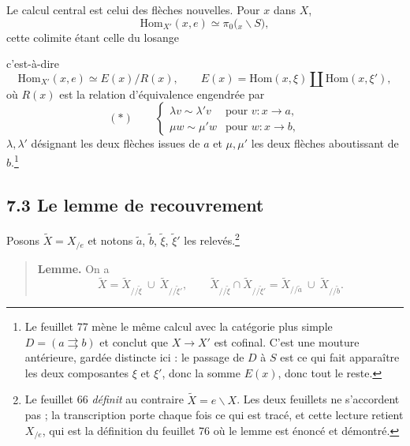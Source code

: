 \documentclass[11pt,a4paper]{article}
\begin{document}

Le calcul central est celui des flèches nouvelles. Pour $x$ dans $X$,
\[
  \mathrm{Hom}_{X'}(x,e) \simeq \pi_{0}\bigl({}_{x}\backslash S\bigr),
\]
cette colimite étant celle du losange

c'est-à-dire
\[
  \mathrm{Hom}_{X'}(x,e) \simeq E(x)/R(x),
  \qquad E(x) = \mathrm{Hom}(x,\xi) \amalg \mathrm{Hom}(x,\xi'),
\]
où $R(x)$ est la relation d'équivalence engendrée par
\[
  (*) \qquad
  \begin{cases}
    \lambda v \sim \lambda' v & \text{pour } v : x \to a, \\
    \mu w \sim \mu' w & \text{pour } w : x \to b,
  \end{cases}
\]
$\lambda, \lambda'$ désignant les deux flèches issues de $a$ et $\mu, \mu'$
les deux flèches aboutissant de $b$.\footnote{Le feuillet 77 mène le même
calcul avec la catégorie plus simple $D = (a \rightrightarrows b)$ et conclut
que $X \to X'$ est cofinal. C'est une mouture antérieure, gardée distincte
ici : le passage de $D$ à $S$ est ce qui fait apparaître les deux composantes
$\xi$ et $\xi'$, donc la somme $E(x)$, donc tout le reste.}

\subsection*{7.3 Le lemme de recouvrement}

Posons $\tilde X = X_{/e}$ et notons $\tilde a$, $\tilde b$, $\tilde\xi$,
$\tilde\xi'$ les relevés.\footnote{Le feuillet 66 \emph{définit} au contraire
$\tilde X = e \backslash X$. Les deux feuillets ne s'accordent pas ; la
transcription porte chaque fois ce qui est tracé, et cette lecture retient
$X_{/e}$, qui est la définition du feuillet 76 où le lemme est énoncé et
démontré.}

\begin{quote}
\textbf{Lemme.} On a
\[
  \tilde X = \tilde X_{/\!/\tilde\xi} \ \cup \ \tilde X_{/\!/\tilde\xi'},
  \qquad
  \tilde X_{/\!/\tilde\xi} \cap \tilde X_{/\!/\tilde\xi'}
  = \tilde X_{/\!/\tilde a} \ \cup \ \tilde X_{/\!/\tilde b}.
\]
\end{quote}
\end{document}
